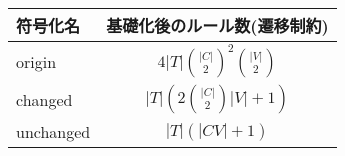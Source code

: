 \begingroup
\renewcommand{\arraystretch}{1.5}
\begin{tabular}{l|c}\hline
  符号化名 & 基礎化後のルール数(遷移制約) \\ \hline
  origin & $4|T|{|C|\choose 2}^{2}{|V|\choose 2}$ \\ \hline
  changed & $|T|\left(2{|C|\choose 2}|V| + 1\right)$ \\ \hline
  unchanged & $|T|(|CV| + 1)$ \\ \hline
\end{tabular}
\endgroup